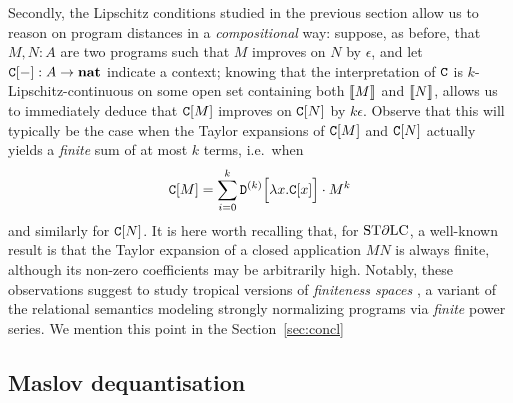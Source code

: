 Secondly, the Lipschitz conditions studied in the previous section allow us to reason on program distances in a \emph{compositional} way: suppose, as before, that $M,N:A$ are two programs such that $M$ improves on $N$ by $\epsilon$, and let $\mathtt{C}[-]:A \to \mathbf{nat}$ indicate a context; knowing that the interpretation of $\mathtt{C}$ is $k$-Lipschitz-continuous on some open set containing both $\llbracket M\rrbracket$ and $\llbracket N\rrbracket$, allows us to immediately deduce that $\mathtt{C}[M]$ improves on $\mathtt{C}[N]$ by $k \epsilon$. 
Observe that this will typically be the case when the Taylor expansions of $\mathtt{C}[M]$ and $\mathtt{C}[N]$ actually yields a \emph{finite} sum of at most $k$ terms, i.e.~when 
\begin{align}
\mathtt{C}[M] = \sum_{i=0}^{k} \mathtt{D}^{(k)}\Big[\lambda x.\mathtt{C}[x]\Big]\cdot M^{k}
\end{align}
and similarly for $\mathtt{C}[N]$. It is here worth recalling that, for $\mathrm{ST}\partial\mathrm{LC}$, a well-known result \cite{} is that the Taylor expansion of a closed application $MN$ is always finite, although its non-zero coefficients may be arbitrarily high. 
Notably, these observations suggest to study tropical versions of \emph{finiteness spaces} \cite{}, 
a variant of the relational semantics modeling strongly normalizing programs via \emph{finite} power series.
We mention this point in the Section~\ref{sec:concl}


\subsection{Maslov dequantisation}

